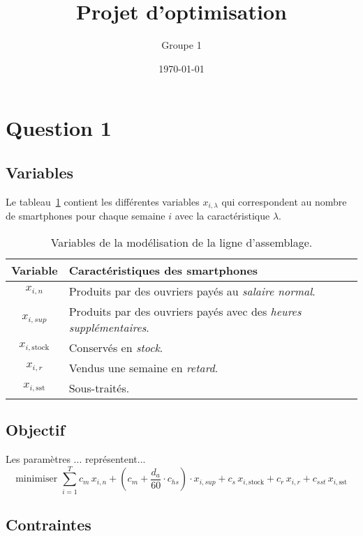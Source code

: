 \documentclass[12pt,oneside,a4paper]{article}
\title{Projet d'optimisation}
\author{Groupe 1}
\date{\today}
\begin{document}
\maketitle

\section{Question 1}

\subsection*{Variables}
Le tableau~\ref{tab:variablesQuestion1} contient les différentes variables $x_{i,\lambda}$
qui correspondent au nombre de smartphones pour chaque semaine $i$
avec la caractéristique $\lambda$.
 
\begin{table}
  \begin{center}
  \begin{tabular}{|c|l|}
    \hline
    Variable & Caractéristiques des smartphones \\
    \hline
    \hline
    $x_{i,n}$ & Produits par des ouvriers payés au \emph{salaire normal}. \\
    \hline
    $x_{i,sup}$ & Produits par des ouvriers payés avec des \emph{heures supplémentaires}. \\
    \hline
    $x_{i,\text{stock}}$ & Conservés en \emph{stock}. \\
    \hline
    $x_{i,r}$ & Vendus une semaine en \emph{retard}. \\
    \hline
    $x_{i,\text{sst}}$ & Sous-traités. \\
    \hline
  \end{tabular}
  \caption{Variables de la modélisation de la ligne d'assemblage.}
  \label{tab:variablesQuestion1}
  \end{center}
\end{table}

\subsection*{Objectif}
Les paramètres ... représentent...
\[
  \mbox{minimiser } 
  \sum_{i=1}^{T} c_m\, x_{i,n} + (c_m + \frac{d_{a}}{60} \cdot c_{hs} ) \cdot x_{i,sup}
  + c_s\, x_{i,\text{stock}} + c_r\, x_{i,r} + c_{sst}\, x_{i,\text{sst}}
\]

\subsection*{Contraintes}
\end{document}
